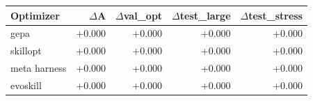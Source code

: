 \begin{tabular}{lrrrr}
\toprule
Optimizer & $\Delta$A & $\Delta$val\_opt & $\Delta$test\_large & $\Delta$test\_stress \\
\midrule
gepa & +0.000 & +0.000 & +0.000 & +0.000 \\
skillopt & +0.000 & +0.000 & +0.000 & +0.000 \\
meta harness & +0.000 & +0.000 & +0.000 & +0.000 \\
evoskill & +0.000 & +0.000 & +0.000 & +0.000 \\
\bottomrule
\end{tabular}
